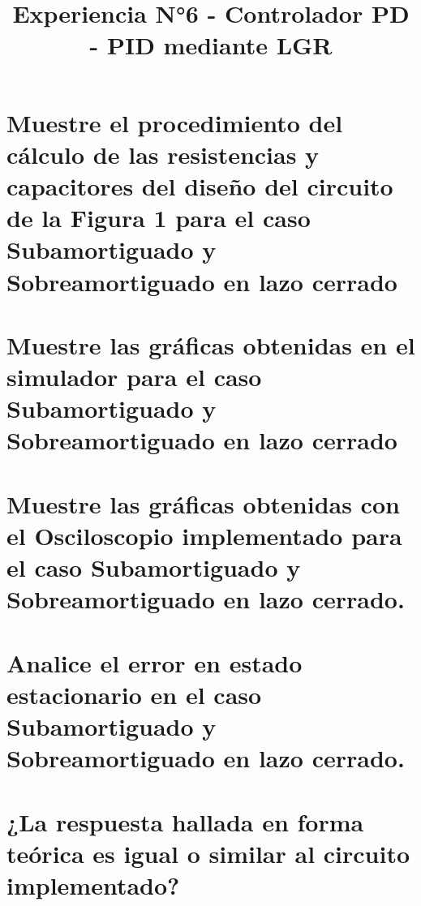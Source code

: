 \documentclass[conference]{IEEEtran}
\begin{document}
	
	\title{Experiencia N°6 - Controlador PD - PID mediante LGR}
	
	\author{
		\and
		\and
	}
	\maketitle
	
	\begin{abstract}
		
	\end{abstract}
	
	\begin{IEEEkeywords}
		
	\end{IEEEkeywords}
	
	\section{Muestre el procedimiento del cálculo de las resistencias y capacitores del diseño del circuito de la Figura 1 para el caso Subamortiguado y Sobreamortiguado en lazo cerrado}
	\section{Muestre las gráficas obtenidas en el simulador para el caso Subamortiguado y Sobreamortiguado en lazo cerrado}
	\section{Muestre las gráficas obtenidas con el Osciloscopio implementado para el caso Subamortiguado y Sobreamortiguado en lazo cerrado.}
	\section{Analice el error en estado estacionario en el caso Subamortiguado y Sobreamortiguado en lazo cerrado.}
	\section{¿La respuesta hallada en forma teórica es igual o similar al circuito implementado?}
	
	
\end{document}
